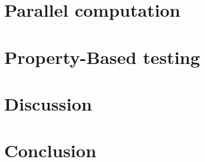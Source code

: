\documentclass[oneside]{book}
\begin{document}


\epigraphhead[450]{}


\epigraphhead[450]{}
\part{Parallel computation}


\epigraphhead[450]{}
\part{Property-Based testing}


\epigraphhead[450]{}
\part{Discussion}


\epigraphhead[450]{}
\part{Conclusion}


\renewcommand\bibname{References}





\end{document}
